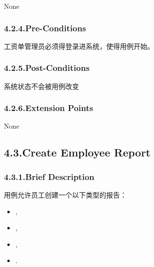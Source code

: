 \documentclass{article}
\begin{document}
\noindent{}None%

\subsubsection{4.2.4.\hspace*{0.5em}Pre-Conditions}\label{sec-pre-conditions}%

\noindent{}工资单管理员必须得登录进系统，使得用例开始。%

\subsubsection{4.2.5.\hspace*{0.5em}Post-Conditions}\label{sec-post-conditions}%

\noindent{}系统状态不会被用例改变%

\subsubsection{4.2.6.\hspace*{0.5em}Extension Points}\label{sec-extension-points}%

\noindent{}None%

\subsection{4.3.\hspace*{0.5em}Create Employee Report}\label{sec-create-employee-report}%

\subsubsection{4.3.1.\hspace*{0.5em}Brief Description}\label{sec-brief-description}%

\noindent{}用例允许员工创建一个以下类型的报告：%

\begin{itemize}[noitemsep,topsep=\mdcompacttopsep]%

\item{},%

\item{},%

\item{},%

\item{}.%
\end{itemize}%
\end{document}

